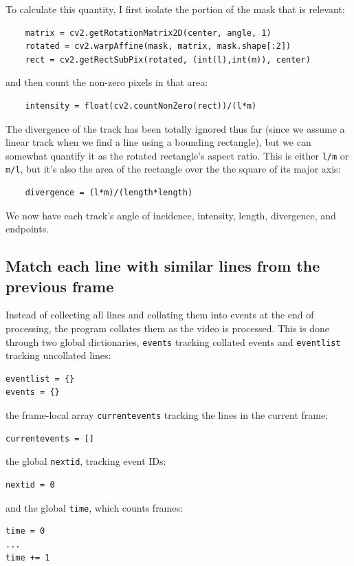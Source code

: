 \documentclass[notitlepage]{article}
\begin{document}
To calculate this quantity, I first isolate the portion of the mask that is relevant:
\begin{lstlisting}
    matrix = cv2.getRotationMatrix2D(center, angle, 1)
    rotated = cv2.warpAffine(mask, matrix, mask.shape[:2])
    rect = cv2.getRectSubPix(rotated, (int(l),int(m)), center)
\end{lstlisting}    
and then count the non-zero pixels in that area:
\begin{lstlisting}
    intensity = float(cv2.countNonZero(rect))/(l*m)
\end{lstlisting}    

The divergence of the track has been totally ignored thus far (since we assume a linear track when we find a line using a bounding rectangle), but we can somewhat quantify it as the rotated rectangle's aspect ratio.  This is either \texttt{l/m} or \texttt{m/l}, but it's also the area of the rectangle over the the square of its major axis:
\begin{lstlisting}
    divergence = (l*m)/(length*length)
\end{lstlisting}
    
We now have each track's angle of incidence, intensity, length, divergence, and endpoints.

\subsection{Match each line with similar lines from the previous frame}

Instead of collecting all lines and collating them into events at the end of processing, the program collates them as the video is processed.  This is done through two global dictionaries, \texttt{events} tracking collated events and \texttt{eventlist} tracking uncollated lines:
\begin{lstlisting}
eventlist = {}
events = {}
\end{lstlisting}    
the frame-local array \texttt{currentevents} tracking the lines in the current frame:
\begin{lstlisting}
currentevents = []
\end{lstlisting}    
the global \texttt{nextid}, tracking event IDs:
\begin{lstlisting}
nextid = 0
\end{lstlisting}    
and the global \texttt{time}, which counts frames:
\begin{lstlisting}
time = 0
...
time += 1
\end{lstlisting}    
\end{document}
